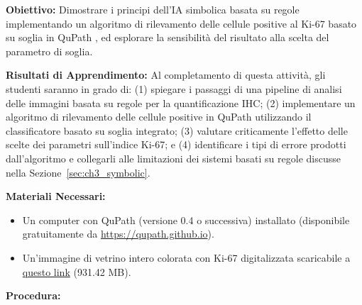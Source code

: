 \textbf{Obiettivo:} Dimostrare i principi dell'IA simbolica basata su regole implementando un algoritmo di rilevamento delle cellule positive al Ki-67 basato su soglia in QuPath \cite{bankhead2017}, ed esplorare la sensibilità del risultato alla scelta del parametro di soglia.

\textbf{Risultati di Apprendimento:} Al completamento di questa attività, gli studenti saranno in grado di: (1) spiegare i passaggi di una pipeline di analisi delle immagini basata su regole per la quantificazione IHC; (2) implementare un algoritmo di rilevamento delle cellule positive in QuPath utilizzando il classificatore basato su soglia integrato; (3) valutare criticamente l'effetto delle scelte dei parametri sull'indice Ki-67; e (4) identificare i tipi di errore prodotti dall'algoritmo e collegarli alle limitazioni dei sistemi basati su regole discusse nella Sezione~\ref{sec:ch3_symbolic}.

\textbf{Materiali Necessari:}
\begin{itemize}
    \item Un computer con QuPath (versione 0.4 o successiva) installato (disponibile gratuitamente da \url{https://qupath.github.io}).
    \item Un'immagine di vetrino intero colorata con Ki-67 digitalizzata scaricabile a \href{https://openslide.cs.cmu.edu/download/openslide-testdata/Hamamatsu/OS-2.ndpi}{questo link} (931.42 MB).
\end{itemize}

\textbf{Procedura:}

